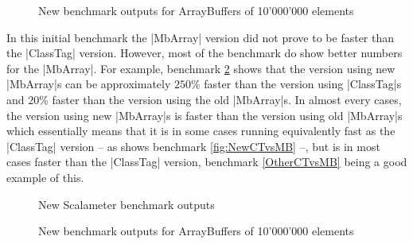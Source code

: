 \begin{figure}
\caption{New benchmark outputs for ArrayBuffers of 10'000'000 elements}
\label{fig:NewGcComp}
\end{figure}

In this initial benchmark the |MbArray| version did not prove to be faster than the |ClassTag| version. However, most of the benchmark do show better numbers for the |MbArray|. For example, benchmark \ref{fig:OtherCTvsMB} shows that the version using new |MbArray|s can be approximately $250\%$ faster than the version using |ClassTag|s and $20\%$ faster than the version using the old |MbArray|s. In almost every cases, the version using new |MbArray|s is faster than the version using old |MbArray|s which essentially means that it is in some cases running equivalently fast as the |ClassTag| version -- as shows benchmark \ref{fig:NewCTvsMB} --, but is in most cases faster than the |ClassTag| version, benchmark \ref{OtherCTvsMB} being a good example of this.  

\begin{figure}
\caption{New Scalameter benchmark outputs}
\label{fig:OtherCTvsMB}
\end{figure}  

\begin{figure}
\caption{New benchmark outputs for ArrayBuffers of 10'000'000 elements}
\label{fig:OtherGcComp}
\end{figure}